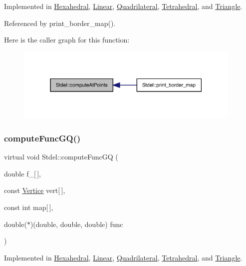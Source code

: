 Implemented in \hyperlink{classHexahedral_a49a57b40396ae96449b3a2aa765b1e8b}{Hexahedral}, \hyperlink{classLinear_a1d0c5885e756d828bfe63bc9021bf20e}{Linear}, \hyperlink{classQuadrilateral_af9b570b455246c2527fa87f186fdabb2}{Quadrilateral}, \hyperlink{classTetrahedral_afba2976521f6a8f5dab936879d3f16da}{Tetrahedral}, and \hyperlink{classTriangle_a1884216b14c0432a2a56c12da809fb37}{Triangle}.



Referenced by print\+\_\+border\+\_\+map().

Here is the caller graph for this function\+:
\nopagebreak
\begin{figure}[H]
\begin{center}
\leavevmode
\includegraphics[width=307pt]{classStdel_a03e038055d238608efce470629863c36_icgraph}
\end{center}
\end{figure}
\mbox{\label{classStdel_a59195ad1ce9b90ef83fd935698dc3305}} 
\subsubsection{\texorpdfstring{compute\+Func\+G\+Q()}{computeFuncGQ()}}
{\footnotesize\ttfamily virtual void Stdel\+::compute\+Func\+GQ (\begin{DoxyParamCaption}\item[{double}]{f\+\_\+\mbox{[}$\,$\mbox{]},  }\item[{const \hyperlink{structVertice}{Vertice}}]{vert\mbox{[}$\,$\mbox{]},  }\item[{const int}]{map\mbox{[}$\,$\mbox{]},  }\item[{double($\ast$)(double, double, double)}]{func }\end{DoxyParamCaption})\hspace{0.3cm}{\ttfamily [pure virtual]}}



Implemented in \hyperlink{classHexahedral_a016d039e52e05f96f2db7ed13e78bcdc}{Hexahedral}, \hyperlink{classLinear_a063af701ae75d39c1aba9674a030ecdd}{Linear}, \hyperlink{classQuadrilateral_a3015a3c877c7fa44d130cc4029729c88}{Quadrilateral}, \hyperlink{classTetrahedral_af2ec99051969b2753ec24e72b9b108f7}{Tetrahedral}, and \hyperlink{classTriangle_ac5aa1a7a531b50d282dbe740efbb9919}{Triangle}.



